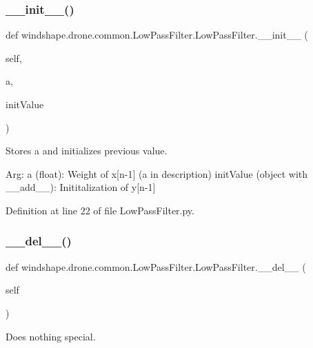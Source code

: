 \subsubsection{\texorpdfstring{\+\_\+\+\_\+init\+\_\+\+\_\+()}{\_\_init\_\_()}}
{\footnotesize\ttfamily def windshape.\+drone.\+common.\+Low\+Pass\+Filter.\+Low\+Pass\+Filter.\+\_\+\+\_\+init\+\_\+\+\_\+ (\begin{DoxyParamCaption}\item[{}]{self,  }\item[{}]{a,  }\item[{}]{init\+Value }\end{DoxyParamCaption})}

\begin{DoxyVerb}Stores a and initializes previous value.

Arg:
    a (float): Weight of x[n-1] (a in description)
    initValue (object with __add__): Inititalization of y[n-1]
\end{DoxyVerb}
 

Definition at line 22 of file Low\+Pass\+Filter.\+py.

\mbox{\label{classwindshape_1_1drone_1_1common_1_1_low_pass_filter_1_1_low_pass_filter_ae6f9d1dd9254ed3a0f2db3e56018039c}} 
\subsubsection{\texorpdfstring{\+\_\+\+\_\+del\+\_\+\+\_\+()}{\_\_del\_\_()}}
{\footnotesize\ttfamily def windshape.\+drone.\+common.\+Low\+Pass\+Filter.\+Low\+Pass\+Filter.\+\_\+\+\_\+del\+\_\+\+\_\+ (\begin{DoxyParamCaption}\item[{}]{self }\end{DoxyParamCaption})}

\begin{DoxyVerb}Does nothing special.\end{DoxyVerb}
 

